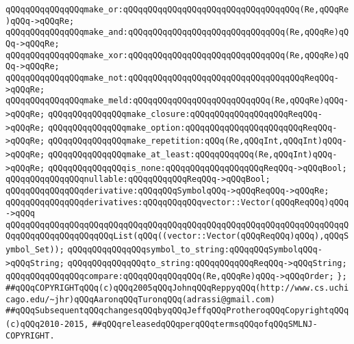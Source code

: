 \newline
\verb|qQQqqQQqqQQqqQQqmake_or:qQQqqQQqqQQqqQQqqQQqqQQqqQQqqQQqqQQq(Re,qQQqRe)qQQq->qQQqRe;|\newline
\verb|qQQqqQQqqQQqqQQqmake_and:qQQqqQQqqQQqqQQqqQQqqQQqqQQqqQQq(Re,qQQqRe)qQQq->qQQqRe;|\newline
\verb|qQQqqQQqqQQqqQQqmake_xor:qQQqqQQqqQQqqQQqqQQqqQQqqQQqqQQq(Re,qQQqRe)qQQq->qQQqRe;|\newline
\verb|qQQqqQQqqQQqqQQqmake_not:qQQqqQQqqQQqqQQqqQQqqQQqqQQqqQQqqQQqReqQQq->qQQqRe;|\newline
\verb|qQQqqQQqqQQqqQQqmake_meld:qQQqqQQqqQQqqQQqqQQqqQQqqQQq(Re,qQQqRe)qQQq->qQQqRe;|\newline
\verb|qQQqqQQqqQQqqQQqmake_closure:qQQqqQQqqQQqqQQqqQQqReqQQq->qQQqRe;|\newline
\verb|qQQqqQQqqQQqqQQqmake_option:qQQqqQQqqQQqqQQqqQQqqQQqReqQQq->qQQqRe;|\newline
\verb|qQQqqQQqqQQqqQQqmake_repetition:qQQq(Re,qQQqInt,qQQqInt)qQQq->qQQqRe;|\newline
\verb|qQQqqQQqqQQqqQQqmake_at_least:qQQqqQQqqQQq(Re,qQQqInt)qQQq->qQQqRe;|\newline
\newline
\verb|qQQqqQQqqQQqqQQqis_none:qQQqqQQqqQQqqQQqqQQqReqQQq->qQQqBool;|\newline
\verb|qQQqqQQqqQQqqQQqnullable:qQQqqQQqqQQqReqQQq->qQQqBool;|\newline
\verb|qQQqqQQqqQQqqQQqderivative:qQQqqQQqSymbolqQQq->qQQqReqQQq->qQQqRe;|\newline
\verb|qQQqqQQqqQQqqQQqderivatives:qQQqqQQqqQQqvector::Vector(qQQqReqQQq)qQQq->qQQq|\newline
\verb|qQQqqQQqqQQqqQQqqQQqqQQqqQQqqQQqqQQqqQQqqQQqqQQqqQQqqQQqqQQqqQQqqQQqqQQqqQQqqQQqqQQqqQQqqQQqList(qQQq((vector::Vector(qQQqReqQQq)qQQq),qQQqSymbol_Set));|\newline
\newline
\verb|qQQqqQQqqQQqqQQqsymbol_to_string:qQQqqQQqSymbolqQQq->qQQqString;|\newline
\verb|qQQqqQQqqQQqqQQqto_string:qQQqqQQqqQQqReqQQq->qQQqString;|\newline
\verb|qQQqqQQqqQQqqQQqcompare:qQQqqQQqqQQqqQQq(Re,qQQqRe)qQQq->qQQqOrder;|\newline
\newline
\verb|};|\newline
\newline
\newline
\verb|##qQQqCOPYRIGHTqQQq(c)qQQq2005qQQqJohnqQQqReppyqQQq(http://www.cs.uchicago.edu/~jhr)qQQqAaronqQQqTuronqQQq(adrassi@gmail.com)|\newline
\verb|##qQQqSubsequentqQQqchangesqQQqbyqQQqJeffqQQqProtheroqQQqCopyrightqQQq(c)qQQq2010-2015,|\newline
\verb|##qQQqreleasedqQQqperqQQqtermsqQQqofqQQqSMLNJ-COPYRIGHT.|\newline

